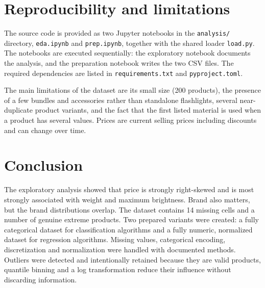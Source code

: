 \documentclass[11pt,a4paper]{article}
\begin{document}
\section{Reproducibility and limitations}

The source code is provided as two Jupyter notebooks in the \texttt{analysis/}
directory, \texttt{eda.ipynb} and \texttt{prep.ipynb}, together with the shared
loader \texttt{load.py}. The notebooks are executed sequentially: the
exploratory notebook documents the analysis, and the preparation notebook writes
the two CSV files. The required dependencies are listed in
\texttt{requirements.txt} and \texttt{pyproject.toml}.

The main limitations of the dataset are its small size (200 products), the
presence of a few bundles and accessories rather than standalone flashlights,
several near-duplicate product variants, and the fact that the first listed
material is used when a product has several values. Prices are current selling
prices including discounts and can change over time.

\section{Conclusion}

The exploratory analysis showed that price is strongly right-skewed and is most
strongly associated with weight and maximum brightness. Brand also matters, but
the brand distributions overlap. The dataset contains 14 missing cells and a
number of genuine extreme products. Two prepared variants were created: a fully
categorical dataset for classification algorithms and a fully numeric,
normalized dataset for regression algorithms. Missing values, categorical
encoding, discretization and normalization were handled with documented
methods. Outliers were detected and intentionally retained because they are
valid products, quantile binning and a log transformation reduce their
influence without discarding information.
\end{document}
